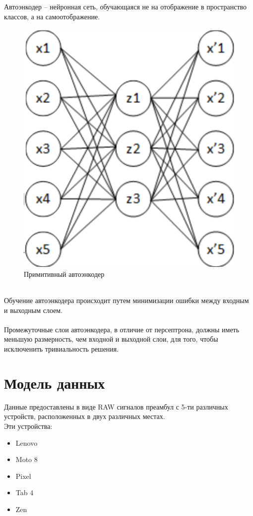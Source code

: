         Автоэнкодер -- нейронная сеть, обучающаяся не на отображение в пространство классов, а на самоотображение.\\
        
        \begin{figure}[h!]
                \centering
                \includegraphics[scale=1]{pictures/autoencoder.png}
                \caption{Примитивный автоэнкодер}
                \label{fig:my_label}
            \end{figure} 
        \par\\
        
        Обучение автоэнкодера происходит путем минимизации ошибки между входным и выходным слоем. \\ \\
        Промежуточные слои автоэнкодера, в отличие от персептрона, должны иметь меньшую размерность, чем входной и выходной слои, для того, чтобы исключенить тривиальность решения.
    \newpage
    \section{Модель данных}
        Данные предоставлены в виде RAW сигналов преамбул с 5-ти различных устройств, расположенных в двух различных местах. \\
        Эти устройства:
        \begin{itemize}
            \item Lenovo
            \item Moto 8
            \item Pixel
            \item Tab 4
            \item Zen
        \end{itemize}\\
        
